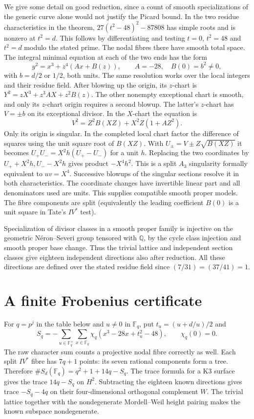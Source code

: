 \documentclass[11pt]{article}
\newcommand{\Q}{\mathbb Q}
\newcommand{\F}{\mathbb F}
\begin{document}
We give some detail on good reduction, since a count of smooth
specializations of the generic curve alone would not justify the
Picard bound. In the two residue characteristics in the theorem,
$27(t^2-48)^2-87808$ has simple roots and is nonzero at $t^2=d$.
This follows by differentiating and testing $t=0$, $t^2=48$ and
$t^2=d$ modulo the stated prime. The nodal fibres there have smooth
total space. The integral minimal equation at each of the two ends
has the form
\[
 y^2=x^3+z^4(Ax+B(z)),\qquad A=-28,\quad B(0)=b^2\ne0,
\]
with $b=d/2$ or $1/2$, both units. The same resolution works over
the local integers and their residue field. After blowing up the
origin, its $z$-chart is $Y^2=zX^3+z^3AX+z^2B(z)$. The other
nonempty exceptional chart is smooth, and only its $z$-chart origin
requires a second blowup. The latter's $z$-chart has $V=\pm b$
on its exceptional divisor. In the $X$-chart the equation is
\[
 V^2=Z^2B(XZ)+X^2 Z(1+AZ^2).
\]
Only its origin is singular. In the completed local chart factor the
difference of squares using the unit square root of $B(XZ)$. With
$U_\pm=V\pm Z\sqrt{B(XZ)}$ it becomes
$U_+U_-=X^2 h(U_+-U_-)$ for a unit $h$.
Replacing the two coordinates by $U_++X^2h,U_--X^2h$
gives product $-X^4h^2$. This is a split $A_3$ singularity
formally equivalent to $uv=X^4$. Successive blowups of the singular
sections resolve it in both characteristics. The coordinate changes
have invertible linear part and all denominators used are units.
This supplies compatible smooth proper models. The fibre components
are split (equivalently the leading coefficient $B(0)$ is a unit
square in Tate's $IV^*$ test).

Specialization of divisor classes in a smooth proper family is
injective on the geometric N\'eron--Severi group tensored with
$\Q$, by the cycle class injection and smooth proper base change.
Thus the trivial lattice and independent section classes give
eighteen independent directions also after reduction. All these
directions are defined over the stated residue field since
$(7/31)=(37/41)=1$.

\section{A finite Frobenius certificate}
For $q=p^j$ in the table below and $u\ne0$ in $\F_q$, put
$t_u=(u+d/u)/2$ and
\[
 S_q=-\!\sum_{u\in\F_q^\times}\sum_{x\in\F_q}
       \chi_q(x^3-28x+t_u^2-48),\qquad \chi_q(0)=0 .
\]
The raw character sum counts a projective nodal fibre correctly as
well. Each split $IV^*$ fibre has $7q+1$ points: its seven rational
components form a tree. Therefore $\#S_d(\F_q)=q^2+1+14q-S_q$.
The trace formula for a K3 surface gives the trace $14q-S_q$ on
$H^2$. Subtracting the eighteen known directions gives trace
$-S_q-4q$ on their four-dimensional orthogonal complement $W$.
The trivial lattice together with the nondegenerate Mordell--Weil
height pairing makes the known subspace nondegenerate.
\end{document}
